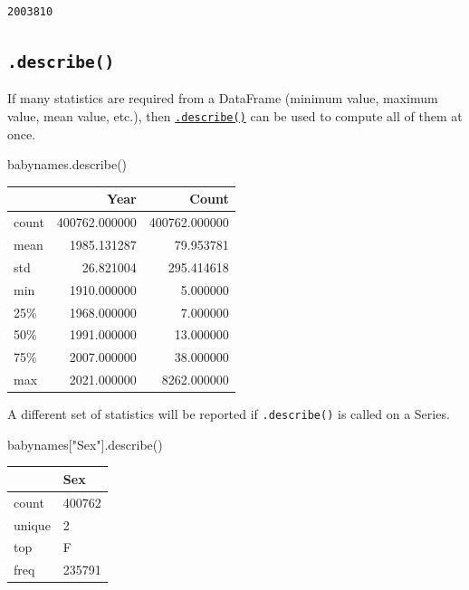 \documentclass[
  letterpaper,
  DIV=11,
  numbers=noendperiod]{scrreprt}
\newenvironment{Shaded}{\begin{snugshade}}{\end{snugshade}}
\newcommand{\NormalTok}[1]{\textcolor[rgb]{0.00,0.23,0.31}{#1}}
\newcommand{\StringTok}[1]{\textcolor[rgb]{0.13,0.47,0.30}{#1}}
\begin{document}
\begin{verbatim}
2003810
\end{verbatim}

\hypertarget{describe}{%
\subsection{\texorpdfstring{\texttt{.describe()}}{.describe()}}\label{describe}}

If many statistics are required from a DataFrame (minimum value, maximum
value, mean value, etc.), then
\href{https://pandas.pydata.org/docs/reference/api/pandas.DataFrame.describe.html}{\texttt{.describe()}}
can be used to compute all of them at once.

\begin{Shaded}
\begin{Highlighting}[]
\NormalTok{babynames.describe()}
\end{Highlighting}
\end{Shaded}

\begin{tabular}{lrr}
\toprule
{} &           Year &          Count \\
\midrule
count &  400762.000000 &  400762.000000 \\
mean  &    1985.131287 &      79.953781 \\
std   &      26.821004 &     295.414618 \\
min   &    1910.000000 &       5.000000 \\
25\%   &    1968.000000 &       7.000000 \\
50\%   &    1991.000000 &      13.000000 \\
75\%   &    2007.000000 &      38.000000 \\
max   &    2021.000000 &    8262.000000 \\
\bottomrule
\end{tabular}

A different set of statistics will be reported if \texttt{.describe()}
is called on a Series.

\begin{Shaded}
\begin{Highlighting}[]
\NormalTok{babynames[}\StringTok{"Sex"}\NormalTok{].describe()}
\end{Highlighting}
\end{Shaded}

\begin{tabular}{ll}
\toprule
{} &     Sex \\
\midrule
count  &  400762 \\
unique &       2 \\
top    &       F \\
freq   &  235791 \\
\bottomrule
\end{tabular}
\end{document}
